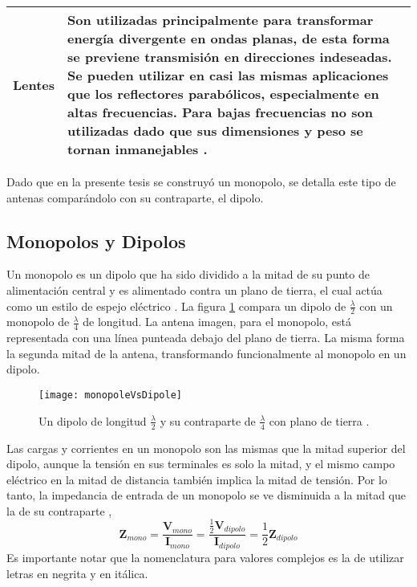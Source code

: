 \begin{table}[H]
\begin{tabular}{l p{12.5cm}}
  Lentes & Son utilizadas principalmente para transformar energía divergente en ondas planas, de esta forma se previene  transmisión en direcciones indeseadas. Se pueden utilizar en casi las mismas aplicaciones que los reflectores parabólicos, especialmente en altas frecuencias. Para bajas frecuencias no son utilizadas dado que sus dimensiones y peso se tornan inmanejables \cite{Balanis2012}. \tabularnewline
  \bottomrule 
  \end{tabular}
  \label{tab:type_antennas}
\end{table}

Dado que en la presente tesis se construyó un monopolo, se detalla este tipo de antenas comparándolo con su contraparte, el dipolo.

\subsection{Monopolos y Dipolos}

Un monopolo es un dipolo que ha sido dividido a la mitad de su punto de alimentación central y es alimentado contra un plano de tierra, el cual actúa como un estilo de espejo eléctrico \cite{arrl2007}. La figura \ref{fig:monopoles} compara un dipolo de $\frac{\lambda}{2}$ con un monopolo de $\frac{\lambda}{4}$ de longitud. La antena imagen, para el monopolo, está representada con una línea punteada debajo del plano de tierra. La misma forma la segunda mitad de la antena, transformando funcionalmente al monopolo en un dipolo.

\begin{figure}
 \centering
 \texttt{[image: monopoleVsDipole]}
 \caption{Un dipolo de longitud $\frac{\lambda}{2}$ y su contraparte de $\frac{\lambda}{4}$ con plano de tierra \cite{arrl2007}.}
 \label{fig:monopoles}
\end{figure}

Las cargas y corrientes en un monopolo son las mismas que la mitad superior del dipolo, aunque la tensión en sus terminales es solo la mitad, y el mismo campo eléctrico en la mitad de distancia también implica la mitad de tensión. Por lo tanto, la impedancia de entrada de un monopolo se ve disminuida a la mitad que la de su contraparte \cite{Stutzman2013},
\begin{equation}
\bm{Z}_{mono} = \dfrac{\bm{V}_{mono}}{\bm{I}_{mono}} = \dfrac{\frac{1}{2}\bm{V}_{dipolo}}{\bm{I}_{dipolo}} = \dfrac{1}{2}\bm{Z}_{dipolo}
\end{equation}
Es importante notar que la nomenclatura para valores complejos es la de utilizar letras en negrita y en itálica.

